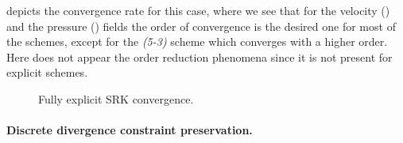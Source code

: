  depicts the convergence rate for this case, where we see that for the velocity () and the pressure () fields the order of convergence is the desired one for most of the schemes, except for the \textit{(5-3)} scheme which converges with a higher order. Here does not appear the order reduction phenomena since it is not present for explicit schemes.
\begin{figure}[h!]
  \centering
  \caption{Fully explicit SRK convergence.}
  \label{fig-Expl_RK_analytical}
\end{figure}


\paragraph{Discrete divergence constraint preservation.}

